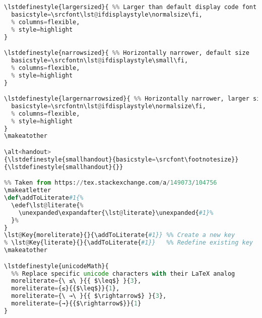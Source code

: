 {\begin{lstlisting}[language=Python,style=normal,escapechar=?,morekeywords={True, False}, mathescape]
\lstdefinestyle{largersized}{ %% Larger than default display code font size
  basicstyle=\srcfont\lst@ifdisplaystyle\normalsize\fi,
  % columns=flexible,
  % style=highlight
}

\lstdefinestyle{narrowsized}{ %% Horizontally narrower, default size
  basicstyle=\srcfontn\lst@ifdisplaystyle\small\fi,
  % columns=flexible,
  % style=highlight
}

\lstdefinestyle{largernarrowsized}{ %% Horizontally narrower, larger size
  basicstyle=\srcfontn\lst@ifdisplaystyle\normalsize\fi,
  % columns=flexible,
  % style=highlight
}
\makeatother

\alt<handout>
{\lstdefinestyle{smallhandout}{basicstyle=\srcfont\footnotesize}}
{\lstdefinestyle{smallhandout}{}}

%% Taken from https://tex.stackexchange.com/a/149073/104756
\makeatletter
\def\addToLiterate#1{%
  \edef\lst@literate{%
    \unexpanded\expandafter{\lst@literate}\unexpanded{#1}%
  }%
}
\lst@Key{moreliterate}{}{\addToLiterate{#1}} %% Create a new key
% \lst@Key{literate}{}{\addToLiterate{#1}}   %% Redefine existing key
\makeatother

\lstdefinestyle{unicodeMath}{
  %% Replace specific unicode characters with their LaTeX analog
  moreliterate={\ ≤\ }{{ $\leq$} }{3},
  moreliterate={≤}{{$\leq$}}{1},
  moreliterate={\ →\ }{{ $\rightarrow$} }{3},
  moreliterate={→}{{$\rightarrow$}}{1}
}


\end{lstlisting}}
